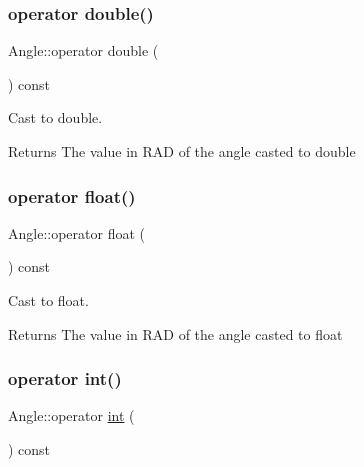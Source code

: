 \subsubsection{\texorpdfstring{operator double()}{operator double()}}
{\footnotesize\ttfamily Angle\+::operator double (\begin{DoxyParamCaption}{ }\end{DoxyParamCaption}) const\hspace{0.3cm}{\ttfamily [inline]}}



Cast to double. 

\begin{DoxyReturn}{Returns}
The value in R\+AD of the angle casted to double 
\end{DoxyReturn}
\mbox{\label{class_angle_a88d0ffaac106cff8233821b2f970b137}} 
\subsubsection{\texorpdfstring{operator float()}{operator float()}}
{\footnotesize\ttfamily Angle\+::operator float (\begin{DoxyParamCaption}{ }\end{DoxyParamCaption}) const\hspace{0.3cm}{\ttfamily [inline]}}



Cast to float. 

\begin{DoxyReturn}{Returns}
The value in R\+AD of the angle casted to float 
\end{DoxyReturn}
\mbox{\label{class_angle_ab4837cee1b926cd3f8f08c91d2d08c70}} 
\subsubsection{\texorpdfstring{operator int()}{operator int()}}
{\footnotesize\ttfamily Angle\+::operator \mbox{\hyperlink{draw_8hh_aa620a13339ac3a1177c86edc549fda9b}{int}} (\begin{DoxyParamCaption}{ }\end{DoxyParamCaption}) const\hspace{0.3cm}{\ttfamily [inline]}}



